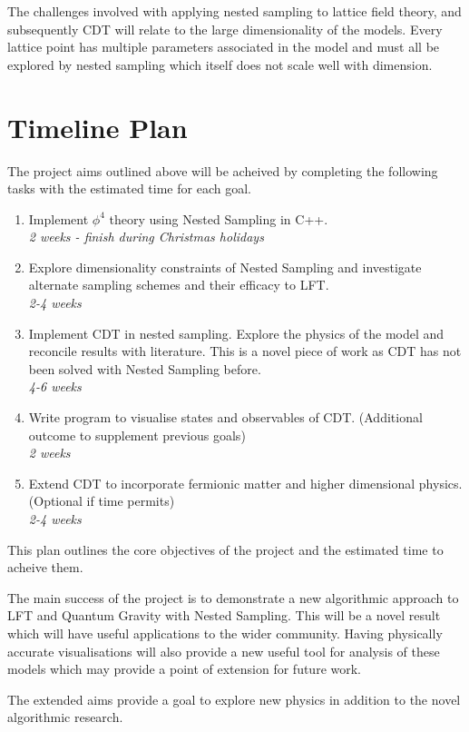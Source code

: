 \documentclass[a4paper]{article}
\begin{document}
The challenges involved with applying nested sampling to lattice field theory, and
subsequently CDT will relate to the large dimensionality of the
models. Every lattice point has multiple parameters associated in the
model and must all be explored by nested sampling which itself does
not scale well with dimension.


\section{Timeline Plan}
The project aims outlined above will be acheived by completing the
following tasks with the estimated time for each goal.

\begin{enumerate}
\item Implement $\phi^4$ theory using Nested Sampling in C++. \\
  {\it 2 weeks - finish during Christmas holidays}
\item Explore dimensionality constraints of Nested Sampling and
  investigate alternate sampling schemes and their efficacy to LFT. \\
  {\it 2-4 weeks}
\item Implement CDT in nested sampling. Explore the physics of the
  model and reconcile results with literature. This is a novel piece
  of work as CDT has not been solved with Nested Sampling before. \\
  {\it 4-6 weeks}
\item Write program to visualise states and observables of
  CDT. (Additional outcome to supplement previous goals) \\
  {\it 2 weeks}
\item Extend CDT to incorporate fermionic matter and higher
  dimensional physics. (Optional if time permits) \\
  {\it 2-4 weeks}
\end{enumerate}

This plan outlines the core objectives of the project and the
estimated time to acheive them.

The main success of the project is to
demonstrate a new algorithmic approach to LFT and Quantum Gravity with Nested
Sampling. This will be a novel result which will have useful
applications to the wider community. Having physically accurate
visualisations will also provide a new useful tool for analysis of
these models which may provide a point of extension for future work. 

The extended aims provide a goal to explore new physics in addition
to the novel algorithmic research.
\end{document}
